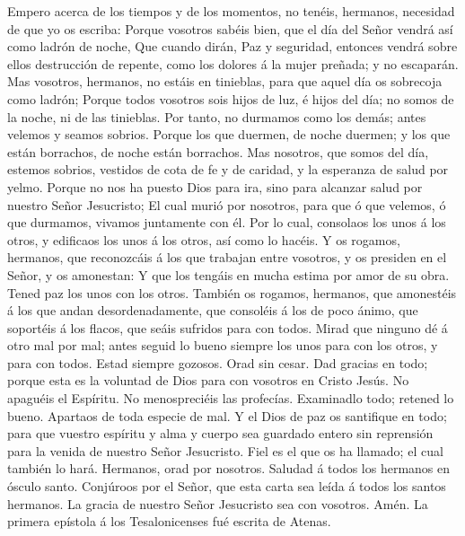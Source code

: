  Empero acerca de los tiempos y de los momentos, no
tenéis, hermanos, necesidad de que yo os escriba:  Porque
vosotros sabéis bien, que el día del Señor vendrá así como ladrón de
noche,  Que cuando dirán, Paz y seguridad, entonces vendrá
sobre ellos destrucción de repente, como los dolores á la mujer preñada;
y no escaparán.  Mas vosotros, hermanos, no estáis en
tinieblas, para que aquel día os sobrecoja como ladrón; 
Porque todos vosotros sois hijos de luz, é hijos del día; no somos de la
noche, ni de las tinieblas.  Por tanto, no durmamos como
los demás; antes velemos y seamos sobrios.  Porque los que
duermen, de noche duermen; y los que están borrachos, de noche están
borrachos.  Mas nosotros, que somos del día, estemos
sobrios, vestidos de cota de fe y de caridad, y la esperanza de salud
por yelmo.  Porque no nos ha puesto Dios para ira, sino
para alcanzar salud por nuestro Señor Jesucristo;  El
cual murió por nosotros, para que ó que velemos, ó que durmamos, vivamos
juntamente con él.  Por lo cual, consolaos los unos á los
otros, y edificaos los unos á los otros, así como lo hacéis.
 Y os rogamos, hermanos, que reconozcáis á los que
trabajan entre vosotros, y os presiden en el Señor, y os amonestan:
 Y que los tengáis en mucha estima por amor de su obra.
Tened paz los unos con los otros.  También os rogamos,
hermanos, que amonestéis á los que andan desordenadamente, que consoléis
á los de poco ánimo, que soportéis á los flacos, que seáis sufridos para
con todos.  Mirad que ninguno dé á otro mal por mal;
antes seguid lo bueno siempre los unos para con los otros, y para con
todos.  Estad siempre gozosos.  Orad sin
cesar.  Dad gracias en todo; porque esta es la voluntad
de Dios para con vosotros en Cristo Jesús.  No apaguéis
el Espíritu.  No menospreciéis las profecías.
 Examinadlo todo; retened lo bueno. 
Apartaos de toda especie de mal.  Y el Dios de paz os
santifique en todo; para que vuestro espíritu y alma y cuerpo sea
guardado entero sin reprensión para la venida de nuestro Señor
Jesucristo.  Fiel es el que os ha llamado; el cual
también lo hará.  Hermanos, orad por nosotros.
 Saludad á todos los hermanos en ósculo santo.
 Conjúroos por el Señor, que esta carta sea leída á todos
los santos hermanos.  La gracia de nuestro Señor
Jesucristo sea con vosotros. Amén. La primera epístola á los
Tesalonicenses fué escrita de Atenas.
